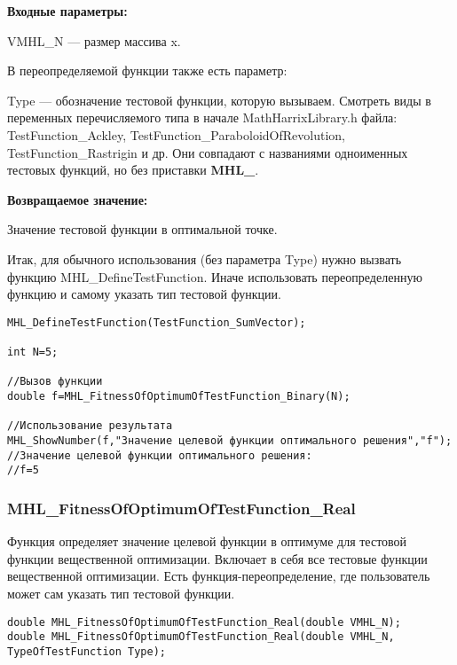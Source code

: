 \documentclass[a4paper,12pt]{article}
\begin{document}
\textbf{Входные параметры:}

VMHL\_N --- размер массива x.

В переопределяемой функции также есть параметр:
  
Type --- обозначение тестовой функции, которую вызываем.
Смотреть виды в переменных перечисляемого типа в начале MathHarrixLibrary.h файла: TestFunction\_Ackley, TestFunction\_ParaboloidOfRevolution, TestFunction\_Rastrigin и др. Они совпадают с названиями одноименных тестовых функций, но без приставки \textbf{MHL\_}.

\textbf{Возвращаемое значение:}
 
Значение тестовой функции в оптимальной точке.

Итак, для обычного использования (без параметра Type) нужно вызвать функцию MHL\_DefineTestFunction. Иначе использовать переопределенную функцию и самому указать тип тестовой функции.


\begin{lstlisting}[label=code_use_MHL_FitnessOfOptimumOfTestFunction_Binary,caption=Пример использования]
MHL_DefineTestFunction(TestFunction_SumVector);

int N=5;

//Вызов функции
double f=MHL_FitnessOfOptimumOfTestFunction_Binary(N);

//Использование результата
MHL_ShowNumber(f,"Значение целевой функции оптимального решения","f");
//Значение целевой функции оптимального решения:
//f=5
\end{lstlisting}

\subsubsection{MHL\_FitnessOfOptimumOfTestFunction\_Real}\label{MHL_FitnessOfOptimumOfTestFunction_Real}

Функция определяет значение целевой функции в оптимуме для тестовой функции вещественной оптимизации. Включает в себя все тестовые функции вещественной оптимизации. Есть функция-переопределение, где пользователь может сам указать тип тестовой функции.


\begin{lstlisting}[label=code_syntax_MHL_FitnessOfOptimumOfTestFunction_Real,caption=Синтаксис]
double MHL_FitnessOfOptimumOfTestFunction_Real(double VMHL_N);
double MHL_FitnessOfOptimumOfTestFunction_Real(double VMHL_N, TypeOfTestFunction Type);
\end{lstlisting}
\end{document}
